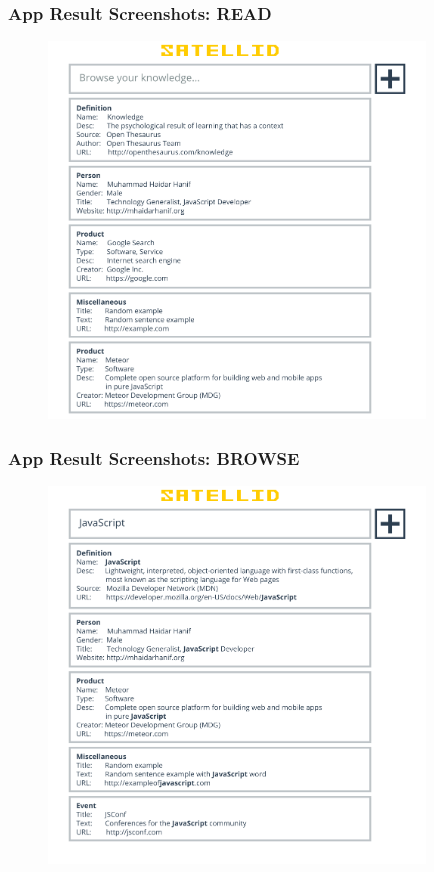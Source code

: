 \documentclass[10pt, compress]{beamer}
\begin{document}
\begin{frame}[fragile]
  \frametitle{App Result Screenshots: READ}

  \begin{figure}[ht]
    \centering
    \vspace{-1cm}
    \includegraphics[height=10cm]{include/satellid-app-results_read.png}
    \vspace{-10pt}
    \label{fig:satellid-app-results_read}
  \end{figure}

\end{frame}


\begin{frame}[fragile]
  \frametitle{App Result Screenshots: BROWSE}

  \begin{figure}[ht]
    \centering
    \vspace{-1cm}
    \includegraphics[height=10cm]{include/satellid-app-results_browse.png}
    \vspace{-10pt}
    \label{fig:satellid-app-results_browse}
  \end{figure}

\end{frame}
\end{document}
